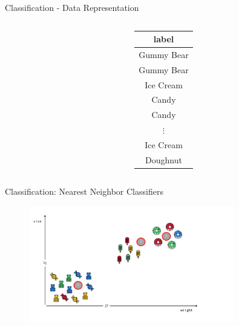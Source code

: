 \documentclass[aspectratio=169]{beamer}
\begin{document}
\begin{frame}{Classification - Data Representation}
\begin{columns}
\begin{column}{0.8\textwidth}
\begin{tabularx}{0.8\textwidth}{@{}c|Y|Y|Y|Y@{}}
                \bottomrule
            \end{tabularx}
        \end{column}
        \begin{column}{0.3\textwidth}
            \begin{tabular}{c}
                \toprule
                \textbf{label}  \\
                \midrule
                Gummy Bear   \\
                \midrule
                 Gummy Bear   \\
                \midrule
                Ice Cream   \\
                \midrule
                Candy   \\
                \midrule
                Candy   \\
                \midrule
                $\vdots$  \\
                \midrule
                Ice Cream   \\
                \midrule
                 Doughnut   \\
                \bottomrule
            \end{tabular}
        \end{column}
    \end{columns}

\end{frame}

\begin{frame}{Classification: Nearest Neighbor Classifiers}
    \begin{figure}
        \centering
        \includegraphics[width=0.8\textwidth]{Figures/example_kNN.pdf}
    \end{figure}
\end{frame}
\end{document}
